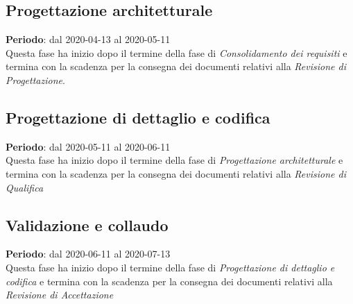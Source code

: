 \subsection{Progettazione architetturale}
\textbf{Periodo}: dal 2020-04-13 al 2020-05-11 \\
Questa fase ha inizio dopo il termine della fase di \textit{Consolidamento dei requisiti} e termina con la scadenza per la consegna dei documenti relativi alla \textit{Revisione di Progettazione}. \\

\subsection{Progettazione di dettaglio e codifica}
\textbf{Periodo}: dal 2020-05-11 al 2020-06-11 \\
Questa fase ha inizio dopo il termine della fase di \textit{Progettazione architetturale} e termina con la scadenza per la consegna dei documenti relativi alla \textit{Revisione di Qualifica}

\subsection{Validazione e collaudo}
\textbf{Periodo}: dal 2020-06-11 al 2020-07-13 \\
Questa fase ha inizio dopo il termine della fase di \textit{Progettazione di dettaglio e codifica} e termina con la scadenza per la consegna dei documenti relativi alla \textit{Revisione di Accettazione}